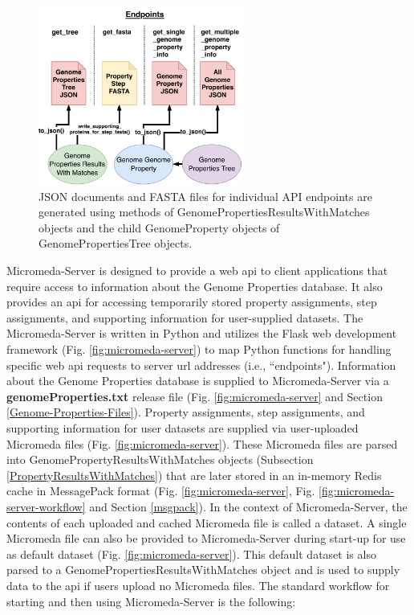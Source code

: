 \begin{figure}[!ht]
  \centering
	\includegraphics[width=0.60\textwidth]{media/Micromeda-Endpoints.pdf}
	 \caption{JSON documents and FASTA files for individual API endpoints are generated using methods of GenomePropertiesResultsWithMatches objects and the child GenomeProperty objects of GenomePropertiesTree objects.}
	 \label{fig:micromeda-endpoints}
\end{figure}

Micromeda-Server is designed to provide a web \gls{api} to client applications that require access to information about the Genome Properties database. It also provides an \gls{api} for accessing temporarily stored property assignments, step assignments, and supporting information for user-supplied datasets. The Micromeda-Server is written in Python and utilizes the Flask web development framework \cite{grinberg2018flask} (Fig. \ref{fig:micromeda-server}) to map Python functions for handling specific web \gls{api} requests to server \gls{url} addresses (i.e., ``endpoints"). Information about the Genome Properties database is supplied to Micromeda-Server via a \textbf{genomeProperties.txt} release file (Fig. \ref{fig:micromeda-server} and Section \ref{Genome-Properties-Files}). Property assignments, step assignments, and supporting information for user datasets are supplied via user-uploaded Micromeda files (Fig. \ref{fig:micromeda-server}). These Micromeda files are parsed into GenomePropertyResultsWithMatches objects (Subsection \ref{PropertyResultsWithMatches}) that are later stored in an in-memory Redis cache \cite{han2011survey} in MessagePack format \cite{furuhashi2013messagepack} (Fig. \ref{fig:micromeda-server}, Fig. \ref{fig:micromeda-server-workflow} and Section \ref{msgpack}). In the context of Micromeda-Server, the contents of each uploaded and cached Micromeda file is called a dataset. A single Micromeda file can also be provided to Micromeda-Server during start-up for use as default dataset (Fig. \ref{fig:micromeda-server}). This default dataset is also parsed to a GenomePropertiesResultsWithMatches object and is used to supply data to the \gls{api} if users upload no Micromeda files. The standard workflow for starting and then using Micromeda-Server is the following:

